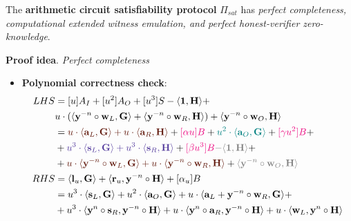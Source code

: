 \documentclass[../../book.tex]{subfiles}
\begin{document}
\begin{theorem}
    The \textbf{arithmetic circuit satisfiability protocol} $\Pi_{sat}$ has \textit{perfect completeness, computational extended witness emulation, and perfect honest-verifier zero-knowledge}.
    \label{th:arithmetic_circuit_satisfiability}
\end{theorem}
\textbf{Proof idea}. \textit{Perfect completeness} 
\begin{itemize}
    \item \textbf{Polynomial correctness check}:
    \begin{equation*}
        \begin{aligned}
            LHS &= [u]A_I + [u^2]A_O + [u^3]S - \langle \mathbf{1}, \mathbf{H} \rangle +\\
            &u \cdot (\langle \mathbf{y}^{-n} \circ \mathbf{w}_L, \mathbf{G} \rangle + \langle \mathbf{y}^{-n} \circ \mathbf{w}_R, \mathbf{H} \rangle) + \langle \mathbf{y}^{-n} \circ \mathbf{w}_O, \mathbf{H} \rangle \\
            &= \textcolor{Sepia}{u \cdot \langle \mathbf{a}_L, \mathbf{G} \rangle + u \cdot \langle \mathbf{a}_R, \mathbf{H} \rangle} + \textcolor{RubineRed}{[\alpha u]B} + \textcolor{teal}{u^2 \cdot \langle \mathbf{a}_O, \mathbf{G} \rangle} + \textcolor{RubineRed}{[\gamma u^2]B} + \\
            &+ \textcolor{Violet}{u^3 \cdot \langle \mathbf{s}_L, \mathbf{G} \rangle + u^3 \cdot \langle \mathbf{s}_R, \mathbf{H} \rangle} + \textcolor{RubineRed}{[\beta u^3]B} \textcolor{gray}{- \langle \mathbf{1}, \mathbf{H} \rangle} + \\
            &+ \textcolor{Sepia}{u \cdot \langle \mathbf{y}^{-n} \circ \mathbf{w}_L, \mathbf{G} \rangle + u\cdot \langle \mathbf{y}^{-n} \circ \mathbf{w}_R, \mathbf{H} \rangle} + \textcolor{gray}{\langle \mathbf{y}^{-n} \circ \mathbf{w}_O, \mathbf{H} \rangle} \\
            RHS &= \langle \mathbf{l}_u, \mathbf{G} \rangle + \langle \mathbf{r}_u, \mathbf{y}^{-n} \circ \mathbf{H} \rangle + [\alpha_u]B \\
            &= u^3 \cdot \langle \mathbf{s}_L, \mathbf{G} \rangle + u^2 \cdot \langle \mathbf{a}_O, \mathbf{G} \rangle + u \cdot \langle \mathbf{a}_L + \mathbf{y}^{-n} \circ \mathbf{w}_R, \mathbf{G} \rangle + \\
            &+ u^3 \cdot \langle \mathbf{y}^n \circ \mathbf{s}_R, \mathbf{y}^{-n} \circ \mathbf{H} \rangle + u \cdot \langle \mathbf{y}^n \circ \mathbf{a}_R, \mathbf{y}^{-n} \circ \mathbf{H} \rangle + u \cdot \langle \mathbf{w}_L, \mathbf{y}^n \circ \mathbf{H} \rangle \\

\end{aligned}
\end{equation*}
\end{itemize}
\end{document}
